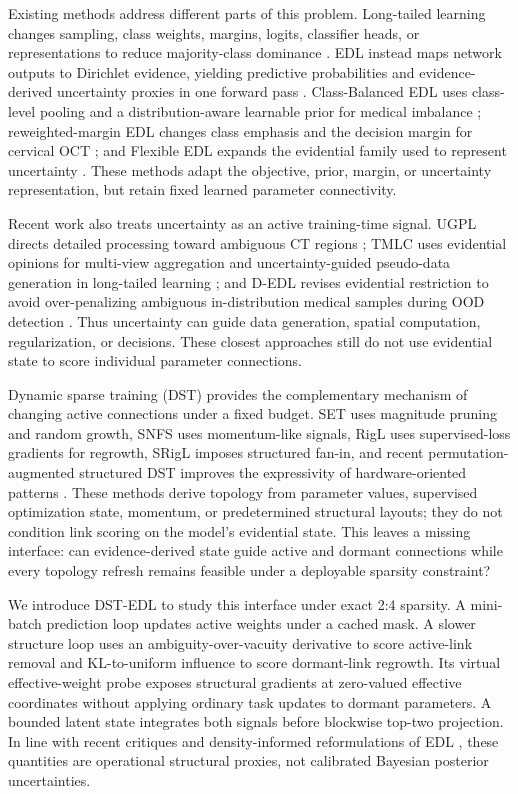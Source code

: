 \documentclass[letterpaper]{article}
\begin{document}
Existing methods address different parts of this problem. Long-tailed learning changes sampling, class weights, margins, logits, classifier heads, or representations to reduce majority-class dominance \cite{cui2019class,cao2019learning,menon2021long,ren2020balanced,kang2019decoupling}. EDL instead maps network outputs to Dirichlet evidence, yielding predictive probabilities and evidence-derived uncertainty proxies in one forward pass \cite{sensoy2018evidential}. Class-Balanced EDL uses class-level pooling and a distribution-aware learnable prior for medical imbalance \cite{xia2024classbalanced}; reweighted-margin EDL changes class emphasis and the decision margin for cervical OCT \cite{zhu2025reweighted}; and Flexible EDL expands the evidential family used to represent uncertainty \cite{yoon2025flexible}. These methods adapt the objective, prior, margin, or uncertainty representation, but retain fixed learned parameter connectivity.

Recent work also treats uncertainty as an active training-time signal. UGPL directs detailed processing toward ambiguous CT regions \cite{venkatraman2025ugpl}; TMLC uses evidential opinions for multi-view aggregation and uncertainty-guided pseudo-data generation in long-tailed learning \cite{tang2026tmlc}; and D-EDL revises evidential restriction to avoid over-penalizing ambiguous in-distribution medical samples during OOD detection \cite{fu2026dedl}. Thus uncertainty can guide data generation, spatial computation, regularization, or decisions. These closest approaches still do not use evidential state to score individual parameter connections.

Dynamic sparse training (DST) provides the complementary mechanism of changing active connections under a fixed budget. SET uses magnitude pruning and random growth, SNFS uses momentum-like signals, RigL uses supervised-loss gradients for regrowth, SRigL imposes structured fan-in, and recent permutation-augmented structured DST improves the expressivity of hardware-oriented patterns \cite{mocanu2018scalable,dettmers2019sparse,evci2020rigging,lasby2023srigl,tyagi2025padst}. These methods derive topology from parameter values, supervised optimization state, momentum, or predetermined structural layouts; they do not condition link scoring on the model's evidential state. This leaves a missing interface: can evidence-derived state guide active and dormant connections while every topology refresh remains feasible under a deployable sparsity constraint?

We introduce DST-EDL to study this interface under exact 2:4 sparsity. A mini-batch prediction loop updates active weights under a cached mask. A slower structure loop uses an ambiguity-over-vacuity derivative to score active-link removal and KL-to-uniform influence to score dormant-link regrowth. Its virtual effective-weight probe exposes structural gradients at zero-valued effective coordinates without applying ordinary task updates to dormant parameters. A bounded latent state integrates both signals before blockwise top-two projection. In line with recent critiques and density-informed reformulations of EDL \cite{shen2024mirage,carlotti2026density}, these quantities are operational structural proxies, not calibrated Bayesian posterior uncertainties.
\end{document}
